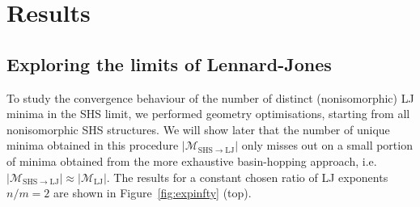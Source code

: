 \section{Results}

\subsection{Exploring the limits of Lennard-Jones}

To study the convergence behaviour of the number of distinct (nonisomorphic) LJ minima in
the SHS limit, we performed geometry optimisations,
starting from all nonisomorphic SHS structures.  We will show later that the
number of unique minima obtained in this procedure $|\mathcal{M}_\mathrm{SHS\to
LJ}|$ only misses out on a small portion of minima obtained from the more exhaustive
basin-hopping approach, i.e.~$|\mathcal{M}_\mathrm{SHS\to
LJ}|\approx|\mathcal{M}_\mathrm{LJ}|$.  The results for a constant chosen ratio
of LJ exponents $n/m=2$ are shown in Figure~\ref{fig:expinfty} (top). 
